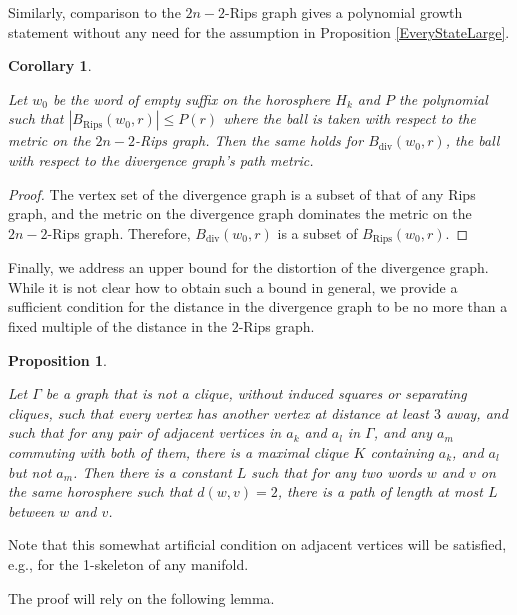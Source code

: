 \documentclass{amsart}
\newtheorem{corollary}[theorem]{Corollary}
\newtheorem{proposition}[theorem]{Proposition}
\theoremstyle{definition}
\theoremstyle{remark}
\begin{document}
	Similarly, comparison to the $2n-2$-Rips graph gives a polynomial growth statement without any need for the assumption in Proposition \ref{EveryStateLarge}.
	
	\begin{corollary}\label{DivergenceGrowth}
		
		Let $w_0$ be the word of empty suffix on the horosphere $H_k$ and $P$ the polynomial such that $|B_{\text{Rips}}(w_0, r)|\le P(r)$ where the ball is taken with respect to the metric on the $2n-2$-Rips graph. Then the same holds for $B_{\text{div}}(w_0, r)$, the ball with respect to the divergence graph's path metric.
		
	\end{corollary}
	
	\begin{proof}
		
		The vertex set of the divergence graph is a subset of that of any Rips graph, and the metric on the divergence graph dominates the metric on the $2n-2$-Rips graph. Therefore, $B_{\text{div}}(w_0, r)$ is a subset of $B_{\text{Rips}}(w_0, r)$.
	\end{proof}
	
	Finally, we address an upper bound for the distortion of the divergence graph. While it is not clear how to obtain such a bound in general, we provide a sufficient condition for the distance in the divergence graph to be no more than a fixed multiple of the distance in the $2$-Rips graph.
	
	\begin{proposition}\label{DivergenceDistortionUpperBound}
		
		Let $\Gamma$ be a graph that is not a clique, without induced squares or separating cliques, such that every vertex has another vertex at distance at least $3$ away, and such that for any pair of adjacent vertices in $a_{k}$ and $a_l$ in $\Gamma$, and any $a_m$ commuting with both of them, there is a maximal clique $K$ containing $a_k$, and $a_l$ but not $a_m$. Then there is a constant $L$ such that for any two words $w$ and $v$ on the same horosphere such that $d(w,v)=2$, there is a path of length at most $L$ between $w$ and $v$. 
		
	\end{proposition}
	
	
	Note that this somewhat artificial condition on adjacent vertices will be satisfied, e.g., for the 1-skeleton of any manifold. 
	
	The proof will rely on the following lemma.
	
\end{document}
